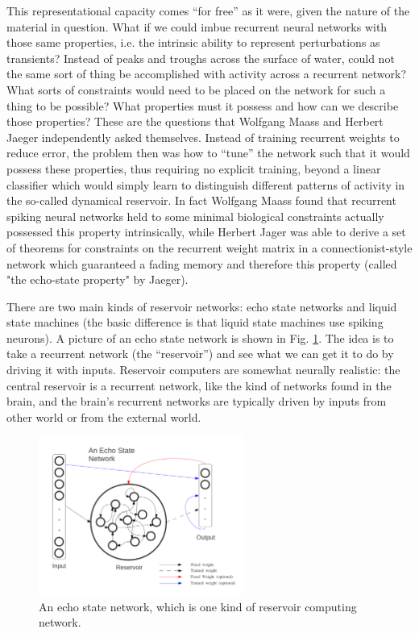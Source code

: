 This representational capacity comes ``for free'' as it were, given the nature of the material in question. What if we could imbue recurrent neural networks with those same properties, i.e. the intrinsic ability to represent perturbations as transients? Instead of peaks and troughs across the surface of water, could not the same sort of thing be accomplished with activity across a recurrent network? What sorts of constraints would need to be placed on the network for such a thing to be possible? What properties must it possess and how can we describe those properties? These are the questions that Wolfgang Maass and Herbert Jaeger independently asked themselves. Instead of training recurrent weights to reduce error, the problem then was how to ``tune'' the network such that it would possess these properties, thus requiring no explicit training, beyond a linear classifier which would simply learn to distinguish different patterns of activity in the so-called dynamical reservoir. In fact Wolfgang Maass found that recurrent spiking neural networks held to some minimal biological constraints actually possessed this property intrinsically, while Herbert Jager was able to derive a set of theorems for constraints on the recurrent weight matrix in a connectionist-style network which guaranteed a fading memory and therefore this property (called "the echo-state property" by Jaeger). 

 There are two main kinds of reservoir networks: echo state networks and liquid state machines (the basic difference is that liquid state machines use spiking neurons). A picture of an echo state network is shown in Fig. \ref{F:esn}. The idea is to take a recurrent network (the ``reservoir'') and see what we can get it to do by driving it with inputs. Reservoir computers are somewhat neurally realistic: the central reservoir is a recurrent network, like the kind of networks found in the brain, and the brain's recurrent networks are typically driven by inputs from other world or from the external world.

\begin{figure}[h]
\centering
\includegraphics[width=0.6\textwidth]{images/ESNDiagram.png}
\caption[Zo\"e Tosi.]{An echo state network, which is one kind of reservoir computing network.}
\label{F:esn}
\end{figure}

